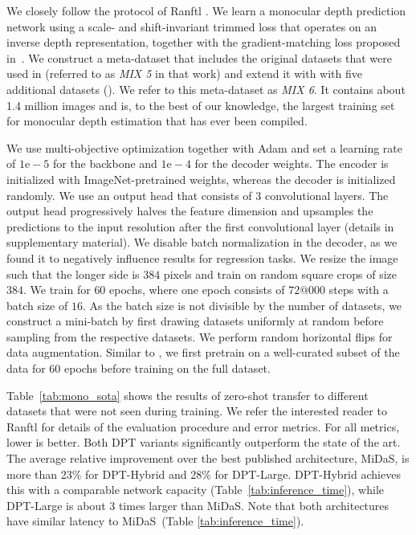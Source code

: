 \documentclass[10pt,twocolumn,letterpaper]{article}
\begin{document}
 We closely follow the protocol of Ranftl
\etal\cite{Ranftl2020}. We learn a monocular depth prediction network using a
scale- and shift-invariant trimmed loss that operates on an inverse depth
representation, together with the gradient-matching loss proposed
in~\cite{LiSnavely2018}. We construct a meta-dataset that includes the original
datasets that were used in \cite{Ranftl2020} (referred to as \emph{MIX 5} in
that work) and extend it with with five additional datasets
(\cite{Xian2020,Yao2020,tartanair2020,Huang2020,irs2020}). We refer to this
meta-dataset as \emph{MIX 6}. It contains about 1.4 million images and is, to
the best of our knowledge, the largest training set for monocular depth
estimation that has ever been compiled.

We use multi-objective optimization \cite{Sener2018} together with Adam
\cite{Kingma2015} and set a learning rate of $1\mathrm{e-}5$ for the backbone
and $1\mathrm{e-}4$ for the decoder weights. The encoder is initialized with
ImageNet-pretrained weights, whereas the decoder is initialized randomly. We use
an output head that consists of 3 convolutional layers. The output head
progressively halves the feature dimension and upsamples the predictions to the
input resolution after the first convolutional layer (details in supplementary
material). We disable batch normalization in the decoder, as we found it to
negatively influence results for regression tasks. We resize the image such that
the longer side is $384$ pixels and train on random square crops of size $384$.
We train for $60$ epochs, where one epoch consists of $72@000$ steps with a
batch size of $16$. As the batch size is not divisible by the number of
datasets, we construct a mini-batch by first drawing datasets uniformly at
random before sampling from the respective datasets. We perform random
horizontal flips for data augmentation. Similar to \cite{Ranftl2020}, we first
pretrain on a well-curated subset of the data \cite{Xian2020,Xian2018,Yao2020}
for $60$ epochs before training on the full dataset.


 Table~\ref{tab:mono_sota} shows
the results of zero-shot transfer to different datasets that were not seen during training. We refer the
interested reader to Ranftl \etal\cite{Ranftl2020} for details of the evaluation procedure
and error metrics. For all metrics, lower is better. Both DPT
variants significantly outperform the state of the art. The average relative
improvement over the best published architecture, MiDaS, is more than
23\% for DPT-Hybrid and 28\% for DPT-Large. DPT-Hybrid achieves this with a
comparable network capacity (Table~\ref{tab:inference_time}), while
DPT-Large is about $3$ times larger than MiDaS. Note that both architectures
have similar latency to MiDaS~(Table \ref{tab:inference_time}).
\end{document}

